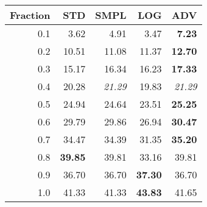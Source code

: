 \documentclass{standalone}
\begin{document}
\begin{tabular}{r|rrrr}
      \toprule
      Fraction & STD & SMPL & LOG & ADV\\
      \midrule
      0.1 & 3.62 & 4.91 & 3.47 & \textbf{7.23}\\
  0.2 & 10.51 & 11.08 & 11.37 & \textbf{12.70}\\
  0.3 & 15.17 & 16.34 & 16.23 & \textbf{17.33}\\
  0.4 & 20.28 & \emph{21.29} & 19.83 & \emph{21.29}\\
  0.5 & 24.94 & 24.64 & 23.51 & \textbf{25.25}\\
  0.6 & 29.79 & 29.86 & 26.94 & \textbf{30.47}\\
  0.7 & 34.47 & 34.39 & 31.35 & \textbf{35.20}\\
  0.8 & \textbf{39.85} & 39.81 & 33.16 & 39.81\\
  0.9 & 36.70 & 36.70 & \textbf{37.30} & 36.70\\
  1.0 & 41.33 & 41.33 & \textbf{43.83} & 41.65\\
  \bottomrule
\end{tabular}
\end{document}
